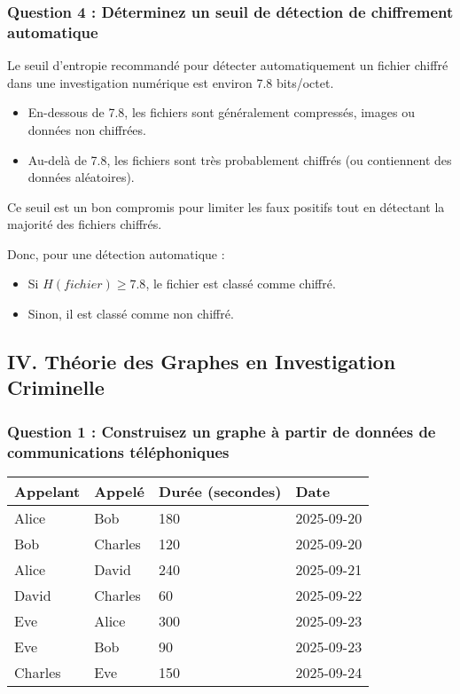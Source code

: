 \documentclass[12pt, a4paper]{article}
\begin{document}
	\subsubsection*{Question 4 : Déterminez un seuil de détection de chiffrement automatique}
	
	Le seuil d'entropie recommandé pour détecter automatiquement un fichier chiffré dans une investigation numérique est environ 7.8 bits/octet.
	
	\begin{itemize}
		\item En-dessous de 7.8, les fichiers sont généralement compressés, images ou données non chiffrées.
		\item Au-delà de 7.8, les fichiers sont très probablement chiffrés (ou contiennent des données aléatoires).
	\end{itemize}
	
	Ce seuil est un bon compromis pour limiter les faux positifs tout en détectant la majorité des fichiers chiffrés.
	
	Donc, pour une détection automatique :
	\begin{itemize}
		\item Si $H(fichier) \geq 7.8$, le fichier est classé comme chiffré.
		\item Sinon, il est classé comme non chiffré.
	\end{itemize}
	
	\subsection*{IV. Théorie des Graphes en Investigation Criminelle}
	
	\subsubsection*{Question 1 : Construisez un graphe à partir de données de communications téléphoniques}
	
	\begin{table}[H]
		\centering
		\begin{tabular}{|p{3cm}|p{3cm}|p{4cm}|p{3cm}|}
			\hline
			\textbf{Appelant} & \textbf{Appelé} & \textbf{Durée (secondes)} & \textbf{Date} \\
			\hline
			Alice & Bob & 180 & 2025-09-20 \\
			\hline
			Bob & Charles & 120 & 2025-09-20 \\
			\hline
			Alice & David & 240 & 2025-09-21 \\
			\hline
			David & Charles & 60 & 2025-09-22 \\
			\hline
			Eve & Alice & 300 & 2025-09-23 \\
			\hline
			Eve & Bob & 90 & 2025-09-23 \\
			\hline
			Charles & Eve & 150 & 2025-09-24 \\
			\hline
		\end{tabular}
	\end{table}
	
\end{document}
